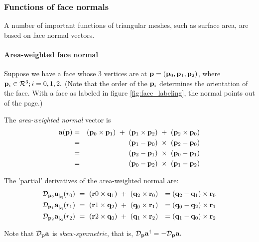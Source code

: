 
\subsubsection{Functions of face normals}
\label{sec:normals}

A number of important functions of triangular meshes,
such as surface area,
are based on face normal vectors.


\paragraph{Area-weighted face normal}
\label{sec:areanormal}

Suppose we have a face whose 3 vertices are at ${\mathbf p} = ({\mathbf p}_0, {\mathbf p}_1, {\mathbf p}_2)$,
where ${\mathbf p}_i \in \mathcal{R}^3; i=0,1,2.$
(Note that the order of the ${\mathbf p}_i$ determines the orientation of the face.
With a face as labeled in figure \ref{fig:face_labeling},
the normal points out of the page.)

The {\it area-weighted normal} vector is
\nopagebreak
\begin{eqnarray}
\a (\p) & = & (\p_0 \times \p_1) \ + \ (\p_1 \times \p_2) \ + \ (\p_2 \times \p_0) \\
        & = & (\p_1 - \p_0) \ \times \ (\p_2 - \p_0) \nonumber \\
        & = & (\p_2 - \p_1) \ \times \ (\p_0 - \p_1) \nonumber \\
        & = & (\p_0 - \p_2) \ \times \ (\p_1 - \p_2) \nonumber
\end{eqnarray}

The 'partial' derivatives of the area-weighted normal are:
\begin{eqnarray}
{\mathcal{D}_{{\mathbf p}_0}{{{\mathbf a}}}_{\mid_{{\mathbf q}}}({{r_0}})} \
& = \ ({\mathbf r}0 \times {\mathbf q}_1) \ + \ ({\mathbf q}_2 \times {\mathbf r}_0) & = ({\mathbf q}_2 - {\mathbf q}_1) \times {\mathbf r}_0 \\
{\mathcal{D}_{{\mathbf p}_1}{{{\mathbf a}}}_{\mid_{{\mathbf q}}}({{r_1}})} \
& = \ ({\mathbf r}1 \times {\mathbf q}_2) \ + \ ({\mathbf q}_0 \times {\mathbf r}_1) & = ({\mathbf q}_0 - {\mathbf q}_2) \times {\mathbf r}_1 \nonumber \\
{\mathcal{D}_{{\mathbf p}_2}{{{\mathbf a}}}_{\mid_{{\mathbf q}}}({{r_2}})} \
& = \ ({\mathbf r}2 \times {\mathbf q}_0) \ + \ ({\mathbf q}_1 \times {\mathbf r}_2) & = ({\mathbf q}_1 - {\mathbf q}_0) \times {\mathbf r}_2 \nonumber
\end{eqnarray}

Note that ${\mathcal D}_{{\mathbf p}}{{\mathbf a}}$ is {\it skew-symmetric}, that is,
${\mathcal D}_{{\mathbf p}}{{\mathbf a}}^{\dagger} = -{\mathcal D}_{{\mathbf p}}{{\mathbf a}}.$

